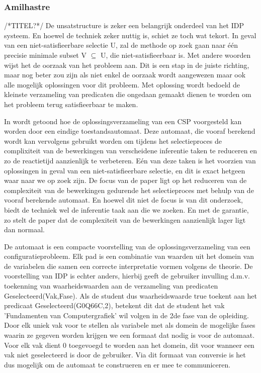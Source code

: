 \subsubsection{Amilhastre} /*TITEL?*/
De unsatstructure is zeker een belangrijk onderdeel van het IDP systeem. En hoewel de techniek zeker nuttig is, schiet ze toch wat tekort. In geval van een niet-satisfieerbare selectie U, zal de methode op zoek gaan naar \'{e}\'{e}n precisie minimale subset V $\subseteq$ U, die niet-satisfieerbaar is. Met andere woorden wijst het de oorzaak van het probleem aan. Dit is een stap in de juiste richting, maar nog beter zou zijn als niet enkel de oorzaak wordt aangewezen maar ook alle mogelijk oplossingen voor dit probleem. Met oplossing wordt bedoeld de kleinste verzameling van predicaten die ongedaan gemaakt dienen te worden om het probleem terug satisfieerbaar te maken. 

In \citep{amilhastre2002consistency} wordt getoond hoe de oplossingsverzameling van een CSP voorgesteld kan worden door een eindige toestandsautomaat. Deze automaat, die vooraf berekend wordt kan vervolgens gebruikt worden om tijdens het selectieproces de complixiteit van de bewerkingen van verscheidene inferentie taken te reduceren en zo de reactietijd aanzienlijk te verbeteren. E\'{e}n van deze taken is het voorzien van oplossingen in geval van een niet-satisfieerbare selectie, en dit is exact hetgeen waar naar we op zoek zijn. De focus van de paper ligt op het reduceren van de complexiteit van de bewerkingen gedurende het selectieproces met behulp van de vooraf berekende automaat. En hoewel dit niet de focus is van dit onderzoek, biedt de techniek wel de inferentie taak aan die we zoeken. En met de garantie, zo stelt de paper dat de complexiteit van de bewerkingen aanzienlijk lager ligt dan normaal. 

De automaat is een compacte voorstelling van de oplossingsverzameling van een configuratieprobleem. Elk pad is een combinatie van waarden uit het domein van de variabelen die samen een correcte interpretatie vormen volgens de theorie. De voorstelling van IDP is echter anders, hierbij geeft de gebruiker invulling d.m.v. toekenning van waarheidswaarden aan de verzameling van predicaten Geselecteerd(Vak,Fase). Als de student dus waarheidswaarde true toekent aan het predicaat Geselecteerd(G0Q66C,2), betekent dit dat de student het vak 'Fundamenten van Computergrafiek' wil volgen in de 2de fase van de opleiding. Door elk uniek vak voor te stellen als variabele met als domein de mogelijke fases waarin ze gegeven worden krijgen we een formaat dat nodig is voor de automaat. Voor elk vak dient 0 toegevoegd te worden aan het domein, dit voor wanneer een vak niet geselecteerd is door de gebruiker. Via dit formaat van conversie is het dus mogelijk om de automaat te construeren en er mee te communiceren.

